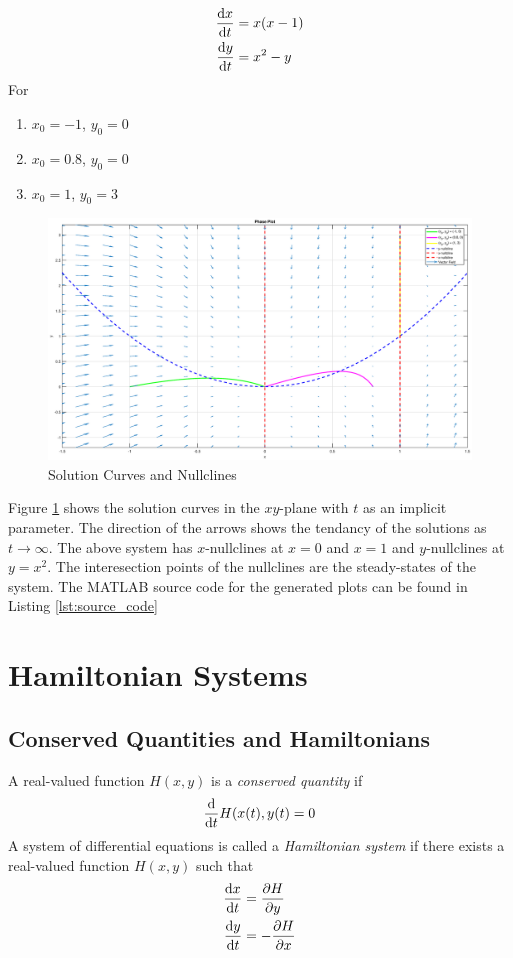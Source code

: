 \documentclass[12pt,1in]{article}
\newenvironment{Example}[2][Example]{\begin{trivlist}
		\item[\hskip \labelsep {\bfseries #1}\hskip \labelsep {\bfseries #2.}]}{\end{trivlist}}
\begin{document}
\begin{Example}{3}
	\cite[p.~487]{diff_eq}
	\begin{align*}
	\derivative{x}{t} &= x(x - 1)\\
	\derivative{y}{t} &= x^2 - y
	\end{align*}
	For 
	\begin{enumerate}
		\item $x_0 = -1$, $y_0 = 0$
		\item $x_0 = 0.8$, $y_0 = 0$
		\item $x_0 = 1$, $y_0 = 3$
	\end{enumerate}
\begin{figure}[H]
	\centering
	\includegraphics[trim={2in 0 2in 0},width=1\linewidth]{Figures/example_3_phase}
	\caption{Solution Curves and Nullclines}
	\label{fig:example3}
\end{figure}
Figure \ref{fig:example3} shows the solution curves in the $xy$-plane with $t$ as an implicit parameter. The direction of the arrows shows the tendancy of the solutions as $t\rightarrow\infty$. The above system has $x$-nullclines at $x = 0$ and $x = 1$ and $y$-nullclines at $y = x^2$. The interesection points of the nullclines are the steady-states of the system. The MATLAB source code for the generated plots can be found in Listing \ref{lst:source_code}
 
\end{Example}
\section{Hamiltonian Systems}
\subsection{Conserved Quantities and Hamiltonians}
A real-valued function $H(x,y)$ is a \textit{conserved quantity} if
\begin{align}
\derivative{}{t}H(x(t), y(t) = 0
\end{align}
A system of differential equations is called a \textit{Hamiltonian system} if there exists a real-valued function $H(x,y)$ such that 
\begin{align}
\derivative{x}{t} &= \frac{\partial H}{\partial y} \label{ham_1} \\
\derivative{y}{t} &= - \frac{\partial H}{\partial x} \label{ham_2}
\end{align}
\end{document}
